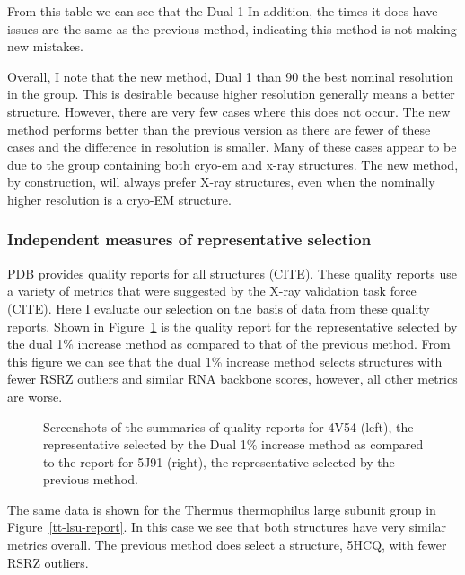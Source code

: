 From this table we can see that the Dual 1%
In addition, the times it does have issues are the same as the previous method,
indicating this method is not making new mistakes. 

Overall, I note that the new method, Dual 1%
than 90%
the best nominal resolution in the group. This is desirable because higher
resolution generally means a better structure. However, there are very few cases
where this does not occur. The new method performs better than the previous
version as there are fewer of these cases and the difference in resolution is
smaller. Many of these cases appear to be due to the group containing both
cryo-em and x-ray structures. The new method, by construction, will always
prefer X-ray structures, even when the nominally higher resolution is a cryo-EM
structure. 

\subsubsection{Independent measures of representative selection}

PDB provides quality reports for all structures (CITE). These quality reports
use a variety of metrics that were suggested by the X-ray validation task force
(CITE). Here I evaluate our selection on the basis of data from these quality
reports. Shown in Figure~\ref{fig:ec-lsu-report} is the quality report for the
representative selected by the dual 1\% increase method as compared to that of
the previous method. From this figure we can see that the dual 1\% increase
method selects structures with fewer RSRZ outliers and similar RNA backbone
scores, however, all other metrics are worse.

\begin{figure}
  \caption{Screenshots of the summaries of quality reports for 4V54 (left), the
    representative selected by the Dual 1\% increase method as compared to the
    report for 5J91 (right), the representative selected by the previous
  method.}
  \label{fig:ec-lsu-report}
\end{figure}

The same data is shown for the Thermus thermophilus large subunit group in
Figure~\ref{tt-lsu-report}. In this case we see that both structures have very
similar metrics overall. The previous method does select a structure, 5HCQ, with
fewer RSRZ outliers. 

